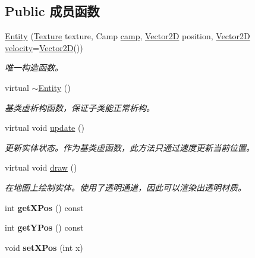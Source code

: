 \subsection*{Public 成员函数}
\begin{DoxyCompactItemize}
\item 
\hyperlink{class_entity_a604327e36e9783d29dd6ae6e4626777a}{Entity} (\hyperlink{struct_texture}{Texture} texture, Camp \hyperlink{class_entity_a5326accd49d3817310ec90692b9da3df}{camp}, \hyperlink{structbasic__vector2_d}{Vector2D} position, \hyperlink{structbasic__vector2_d}{Vector2D} \hyperlink{class_entity_a386d25b56772b8913eb3e5adc636f6e0}{velocity}=\hyperlink{structbasic__vector2_d}{Vector2D}())
\begin{DoxyCompactList}\small\item\em 唯一构造函数。 \end{DoxyCompactList}\item 
virtual \hyperlink{class_entity_a588098978eea6a3486b7361605ff3f0f}{$\sim$\+Entity} ()
\begin{DoxyCompactList}\small\item\em 基类虚析构函数，保证子类能正常析构。 \end{DoxyCompactList}\item 
virtual void \hyperlink{class_entity_a00b6eeaf99b35c8f8b10b5fbfc1baf4f}{update} ()
\begin{DoxyCompactList}\small\item\em 更新实体状态。作为基类虚函数，此方法只通过速度更新当前位置。 \end{DoxyCompactList}\item 
virtual void \hyperlink{class_entity_a7666f416dd0d1fce0f1133f78df44476}{draw} ()
\begin{DoxyCompactList}\small\item\em 在地图上绘制实体。使用了透明通道，因此可以渲染出透明材质。 \end{DoxyCompactList}\item 
\mbox{\label{class_entity_ac704e83937d21eb280bf0618c27e2e66}} 
int {\bfseries get\+X\+Pos} () const
\item 
\mbox{\label{class_entity_a8dc5891871faff09d565738104e1d42f}} 
int {\bfseries get\+Y\+Pos} () const
\item 
\mbox{\label{class_entity_a8afb8aa252cbbffecc2dff0669cb2896}} 
void {\bfseries set\+X\+Pos} (int x)

\end{DoxyCompactItemize}
